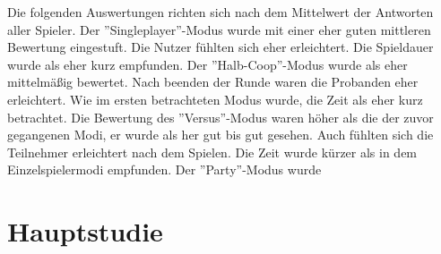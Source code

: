 Die folgenden Auswertungen richten sich nach dem Mittelwert der Antworten aller Spieler.
Der ''Singleplayer''-Modus wurde mit einer eher guten mittleren Bewertung eingestuft. Die Nutzer fühlten sich eher erleichtert. Die Spieldauer wurde als eher kurz empfunden.
Der ''Halb-Coop''-Modus  wurde als eher mittelmäßig bewertet. Nach beenden der Runde waren die Probanden eher erleichtert. Wie im ersten betrachteten Modus wurde, die Zeit als eher kurz betrachtet.
Die Bewertung des ''Versus''-Modus waren höher als die der zuvor gegangenen Modi, er wurde als her gut bis gut gesehen.  Auch fühlten sich die Teilnehmer erleichtert nach dem Spielen. Die Zeit wurde kürzer als in dem Einzelspielermodi empfunden.
Der ''Party''-Modus wurde 


\chapter{Hauptstudie}
